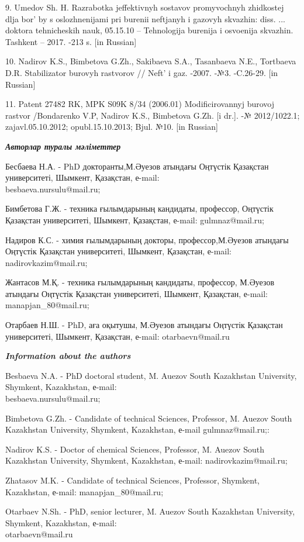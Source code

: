 \begin{references}
9. Umedov Sh. H. Razrabotka jeffektivnyh sostavov promyvochnyh
zhidkostej dlja bor' by s oslozhnenijami pri burenii
neftjanyh i gazovyh skvazhin: diss. ... doktora tehnicheskih nauk,
05.15.10 -- Tehnologija burenija i osvoenija skvazhin. Tashkent -- 2017.
-213 s. {[}in Russian{]}

10. Nadirov K.S., Bimbetova G.Zh., Sakibaeva S.A., Tasanbaeva N.E.,
Tortbaeva D.R. Stabilizator burovyh rastvorov // Neft'{}
i gaz. -2007. -№3. -C.26-29. {[}in Russian{]}

11. Patent 27482 RK, MPK S09K 8/34 (2006.01) Modificirovannyj burovoj
rastvor /Bondarenko V.P, Nadirov K.S., Bimbetova G.Zh. {[}i dr.{]}. -№
2012/1022.1; zajavl.05.10.2012; opubl.15.10.2013; Bjul. №10. {[}in
Russian{]}
\end{references}

\begin{authorinfo}
\emph{{\bfseries Авторлар туралы мәліметтер}}

Бесбаева Н.А. - PhD докторанты,М.Әуезов атындағы Оңтүстік Қазақстан
университеті, Шымкент, Қазақстан, е-mail: \\besbaeva.nursulu@mail.ru;

Бимбетова Г.Ж. - техника ғылымдарының кандидаты, профессор, Оңтүстік
Қазақстан университеті, Шымкент, Қазақстан, е-mail: gulmnaz@mail.ru;

Надиров К.С. - химия ғылымдарының докторы, профессор,М.Әуезов атындағы
Оңтүстік Қазақстан университеті, Шымкент, Қазақстан, е-mail: nadirovkazim@mail.ru;

Жантасов М.Қ. - техника ғылымдарының кандидаты, профессор, М.Әуезов
атындағы Оңтүстік Қазақстан университеті, Шымкент, Қазақстан, е-mail: manapjan\_80@mail.ru;

Отарбаев Н.Ш. - PhD, аға оқытушы, М.Әуезов атындағы Оңтүстік Қазақстан
университеті, Шымкент, Қазақстан, е-mail: otarbaevn@mail.ru

\emph{{\bfseries Information about the authors}}

Besbaeva N.A. - PhD doctoral student, M. Auezov South Kazakhstan
University, Shymkent, Kazakhstan, е-mail: \\besbaeva.nursulu@mail.ru;

Bimbetova G.Zh. - Candidate of technical Sciences, Professor, M. Auezov
South Kazakhstan University, Shymkent, Kazakhstan, е-mail gulmnaz@mail.ru;:

Nadirov K.S. - Doctor of chemical Sciences, Professor, M. Auezov South
Kazakhstan University, Shymkent, Kazakhstan, е-mail: nadirovkazim@mail.ru;

Zhatasov M.K. - Candidate of technical Sciences, Professor, Shymkent,
Kazakhstan, е-mail: manapjan\_80@mail.ru;

Otarbaev N.Sh. - PhD, senior lecturer, M. Auezov South
Kazakhstan University, Shymkent, Kazakhstan, е-mail:\\
otarbaevn@mail.ru
\end{authorinfo}
